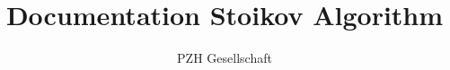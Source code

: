 \documentclass[11pt]{article}
\begin{document}
\title{Documentation Stoikov Algorithm}
\author{PZH Gesellschaft}
\maketitle
\end{document}
